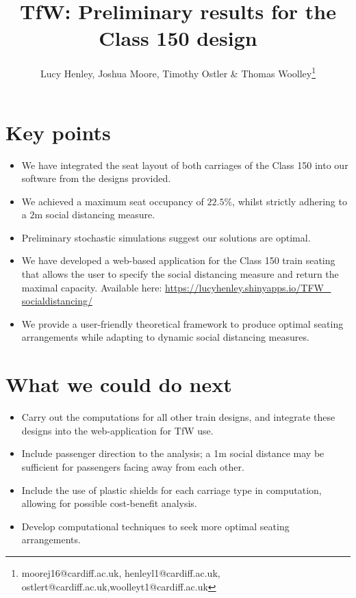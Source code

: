 \documentclass[11pt,a4paper]{article}
\title{TfW: Preliminary results for the Class 150 design}
\author{Lucy Henley, Joshua Moore, Timothy Ostler \& Thomas Woolley\footnote{moorej16@cardiff.ac.uk, henleyl1@cardiff.ac.uk, ostlert@cardiff.ac.uk,woolleyt1@cardiff.ac.uk}}
\begin{document}
\maketitle

\section*{Key points}
\begin{itemize}

\item We have integrated the seat layout of both carriages of the Class 150 into our software from the designs provided.
\item We achieved a maximum seat occupancy of $22.5\%$, whilst strictly adhering to a $2$m social distancing measure. 
\item Preliminary stochastic simulations suggest our solutions are optimal.
\item We have developed a web-based application for the Class 150 train seating that allows the user to specify the social distancing measure and return the maximal capacity. Available here: \href{https://lucyhenley.shinyapps.io/TFW_socialdistancing/}{https://lucyhenley.shinyapps.io/TFW\_ socialdistancing/}
\item We provide a user-friendly theoretical framework to produce optimal seating arrangements while adapting to dynamic social distancing measures.
\end{itemize}

\section*{What we could do next}
\begin{itemize}

\item Carry out the computations for all other train designs, and integrate these designs into the web-application for TfW use.
\item Include passenger direction to the analysis; a 1m social distance may be sufficient for passengers facing away from each other.
\item Include the use of plastic shields for each carriage type in computation, allowing for possible cost-benefit analysis.
\item Develop computational techniques to seek more optimal seating arrangements.

\end{itemize}
\end{document}
